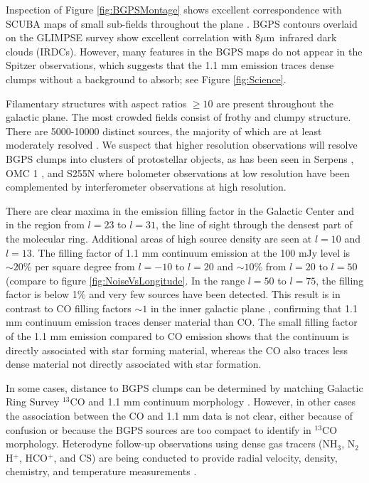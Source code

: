 \documentclass{emulateapj}
\newcommand{\mum}{\ensuremath{\mu \mathrm{m}}}
\newcommand{\lon}{\ensuremath{l}}
\begin{document}
Inspection of Figure \ref{fig:BGPSMontage} shows excellent
correspondence with SCUBA maps of small sub-fields throughout the
plane \citep{difrancesco08}.  BGPS contours overlaid on the GLIMPSE
survey \citep{benjamin03} show excellent correlation with 8\mum\
infrared dark clouds (IRDCs).  However, many features in the BGPS maps
do not appear in the Spitzer observations, which suggests that the 1.1
mm emission traces dense clumps without a background to absorb; see
Figure \ref{fig:Science}.




Filamentary structures with aspect ratios $\geq 10$ are present
throughout the galactic plane.  The most crowded fields consist of
frothy and clumpy structure.  There are 5000-10000 distinct sources,
the majority of which are at least moderately resolved
\citep{rosolowsky09}.  We suspect that higher resolution observations
will resolve BGPS clumps into clusters of protostellar objects, as has
been seen in Serpens \citep{enoch08,Testi1998}, OMC 1
\citep{beuther04,johnstone99}, and S255N \citep{cyganowski07} where
bolometer observations at low resolution have been complemented by
interferometer observations at high resolution.

There are clear maxima in the emission filling factor in the Galactic
Center and in the region from $\lon=23$ to $\lon=31$, the line of
sight through the densest part of the molecular ring.  Additional
areas of high source density are seen at $\lon=10$ and $\lon=13$.  The
filling factor of 1.1 mm continuum emission at the 100 mJy level is
$\sim 20$\% per square degree from $\lon=-10$ to $\lon=20$ and $\sim
10$\% from $\lon=20$ to $\lon=50$ (compare to figure
\ref{fig:NoiseVsLongitude}.  In the range $\lon=50$ to $\lon=75$, the
filling factor is below 1\% and very few sources have been detected.
This result is in contrast to CO filling factors $\sim1$ in the inner
galactic plane \citep{dame01,jackson06}, confirming that 1.1 mm
continuum emission traces denser material than CO.  The small filling
factor of the 1.1 mm emission compared to CO emission shows that the
continuum is directly associated with star forming material, whereas
the CO also traces less dense material not directly associated with
star formation.

In some cases, distance to BGPS clumps can be determined by matching
Galactic Ring Survey $^{13}$CO and 1.1 mm continuum morphology
\citep{IRDCdistance,jackson06}.  However, in other cases the
association between the CO and 1.1 mm data is not clear, either
because of confusion or because the BGPS sources are too compact to
identify in $^{13}$CO morphology.  Heterodyne follow-up observations
using dense gas tracers (NH$_3$, N$_2$H$^+$, HCO$^+$, and CS) are
being conducted to provide radial velocity, density, chemistry, and
temperature measurements \citep{schlingman09,battersby09, nordhaus09}.
\end{document}
